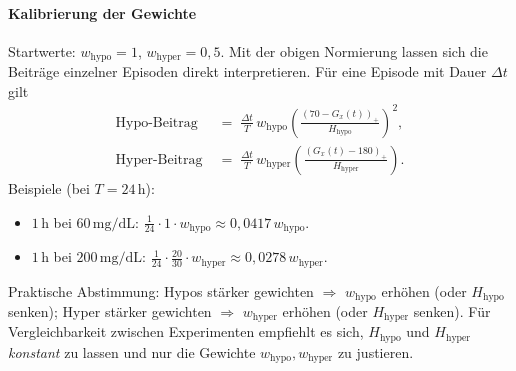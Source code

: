 \documentclass[ngerman,a4paper,12pt,pdftex]{article}
\begin{document}
\paragraph{Kalibrierung der Gewichte}
Startwerte: \(w_{\mathrm{hypo}}=1\), \(w_{\mathrm{hyper}}=0{,}5\). Mit der obigen Normierung lassen sich die Beiträge einzelner Episoden direkt interpretieren. Für eine Episode mit Dauer \(\Delta t\) gilt
\[
\begin{aligned}
\text{Hypo-Beitrag} \; &=\; \frac{\Delta t}{T}\, w_{\mathrm{hypo}} \left( \frac{(70-G_x(t))_+}{H_{\text{hypo}}} \right)^{\!2},\\
\text{Hyper-Beitrag} \; &=\; \frac{\Delta t}{T}\, w_{\mathrm{hyper}} \left( \frac{(G_x(t)-180)_+}{H_{\text{hyper}}} \right).
\end{aligned}
\]
Beispiele (bei \(T=24\,\mathrm{h}\)):
\begin{itemize}
  \item \(1\,\mathrm{h}\) bei \(60\,\mathrm{mg/dL}\): \(\tfrac{1}{24}\cdot 1 \cdot w_{\mathrm{hypo}} \approx 0{,}0417\,w_{\mathrm{hypo}}\).
  \item \(1\,\mathrm{h}\) bei \(200\,\mathrm{mg/dL}\): \(\tfrac{1}{24}\cdot \tfrac{20}{30}\cdot w_{\mathrm{hyper}} \approx 0{,}0278\,w_{\mathrm{hyper}}\).
\end{itemize}
Praktische Abstimmung: Hypos stärker gewichten \(\Rightarrow\) \(w_{\mathrm{hypo}}\) erhöhen (oder \(H_{\text{hypo}}\) senken); Hyper stärker gewichten \(\Rightarrow\) \(w_{\mathrm{hyper}}\) erhöhen (oder \(H_{\text{hyper}}\) senken). Für Vergleichbarkeit zwischen Experimenten empfiehlt es sich, \(H_{\text{hypo}}\) und \(H_{\text{hyper}}\) \emph{konstant} zu lassen und nur die Gewichte \(w_{\mathrm{hypo}}, w_{\mathrm{hyper}}\) zu justieren.
\vspace{1em}
\vspace{1em}
\newcommand{\Dtmin}{30\,\mathrm{min}}
\FloatBarrier
\end{document}
